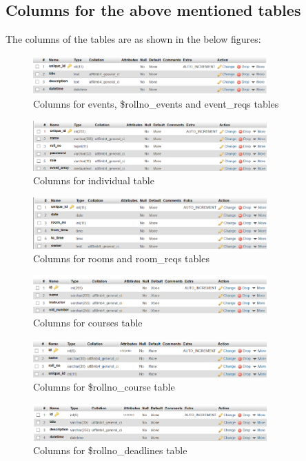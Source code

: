 \documentclass[12pt]{article}
\begin{document}
\subsection{Columns for the above mentioned tables}
The columns of the tables are as shown in the below figures:
\begin{figure}[!ht]
\center
\includegraphics [width = 0.8\textwidth]{events}
\caption{Columns for events, \$rollno\_events and event\_reqs tables}
\label{fig:e}
\end{figure}

\begin{figure}[!ht]
\center
\includegraphics [width = 0.8\textwidth]{individual}
\caption{Columns for individual table}
\label{fig:i}
\end{figure}

\begin{figure}[!ht]
\center
\includegraphics [width = 0.8\textwidth]{rooms}
\caption{Columns for rooms and room\_reqs tables}
\label{fig:r}
\end{figure}

\begin{figure}[!ht]
\center
\includegraphics [width = 0.8\textwidth]{courses}
\caption{Columns for courses table}
\label{fig:c}
\end{figure}

\begin{figure}[!ht]
\center
\includegraphics [width = 0.8\textwidth]{student}
\caption{Columns for \$rollno\_course table}
\label{fig:s}
\end{figure}

\begin{figure}[!ht]
\center
\includegraphics [width = 0.8\textwidth]{deadline}
\caption{Columns for \$rollno\_deadlines table}
\label{fig:d}
\end{figure}
\end{document}
